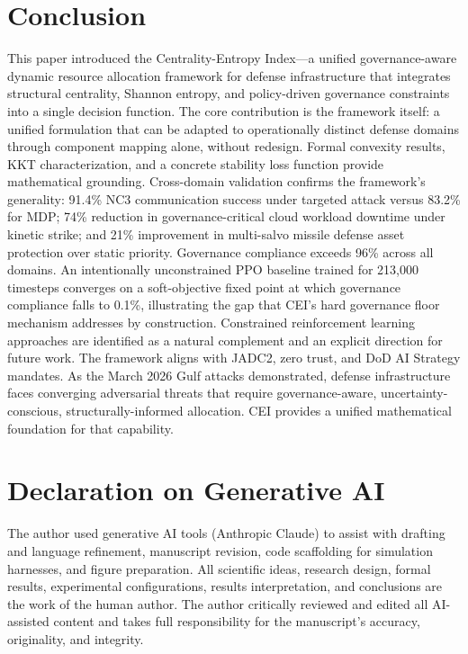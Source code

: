 \documentclass[runningheads]{llncs}
\begin{document}
\section{Conclusion}
\label{sec:conclusion}

This paper introduced the Centrality-Entropy Index---a unified governance-aware dynamic resource allocation framework for defense infrastructure that integrates structural centrality, Shannon entropy, and policy-driven governance constraints into a single decision function. The core contribution is the framework itself: a unified formulation that can be adapted to operationally distinct defense domains through component mapping alone, without redesign. Formal convexity results, KKT characterization, and a concrete stability loss function provide mathematical grounding. Cross-domain validation confirms the framework's generality: 91.4\% NC3 communication success under targeted attack versus 83.2\% for MDP; 74\% reduction in governance-critical cloud workload downtime under kinetic strike; and 21\% improvement in multi-salvo missile defense asset protection over static priority. Governance compliance exceeds 96\% across all domains. An intentionally unconstrained PPO baseline trained for 213{,}000 timesteps converges on a soft-objective fixed point at which governance compliance falls to 0.1\%, illustrating the gap that CEI's hard governance floor mechanism addresses by construction. Constrained reinforcement learning approaches are identified as a natural complement and an explicit direction for future work. The framework aligns with JADC2, zero trust, and DoD AI Strategy mandates. As the March 2026 Gulf attacks demonstrated, defense infrastructure faces converging adversarial threats that require governance-aware, uncertainty-conscious, structurally-informed allocation. CEI provides a unified mathematical foundation for that capability.

\section*{Declaration on Generative AI}
The author used generative AI tools (Anthropic Claude) to assist with drafting and language refinement, manuscript revision, code scaffolding for simulation harnesses, and figure preparation. All scientific ideas, research design, formal results, experimental configurations, results interpretation, and conclusions are the work of the human author. The author critically reviewed and edited all AI-assisted content and takes full responsibility for the manuscript's accuracy, originality, and integrity.
\end{document}
